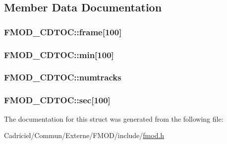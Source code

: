 \subsection{Member Data Documentation}
\hypertarget{struct_f_m_o_d___c_d_t_o_c_a40e8bdc25c765a02c4ca0af13c74dc5f}{
\subsubsection[{frame}]{ F\-M\-O\-D\-\_\-\-C\-D\-T\-O\-C\-::frame\mbox{[}100\mbox{]}}}\label{struct_f_m_o_d___c_d_t_o_c_a40e8bdc25c765a02c4ca0af13c74dc5f}
\hypertarget{struct_f_m_o_d___c_d_t_o_c_ac32672636e86e7d5da6cd02737123f0e}{
\subsubsection[{min}]{ F\-M\-O\-D\-\_\-\-C\-D\-T\-O\-C\-::min\mbox{[}100\mbox{]}}}\label{struct_f_m_o_d___c_d_t_o_c_ac32672636e86e7d5da6cd02737123f0e}
\hypertarget{struct_f_m_o_d___c_d_t_o_c_aad0a3526919d1d67958c47179a73cf7b}{
\subsubsection[{numtracks}]{ F\-M\-O\-D\-\_\-\-C\-D\-T\-O\-C\-::numtracks}}\label{struct_f_m_o_d___c_d_t_o_c_aad0a3526919d1d67958c47179a73cf7b}
\hypertarget{struct_f_m_o_d___c_d_t_o_c_a20dcf991841f7f4322904f9a1175e7c6}{
\subsubsection[{sec}]{ F\-M\-O\-D\-\_\-\-C\-D\-T\-O\-C\-::sec\mbox{[}100\mbox{]}}}\label{struct_f_m_o_d___c_d_t_o_c_a20dcf991841f7f4322904f9a1175e7c6}


The documentation for this struct was generated from the following file\-:\begin{DoxyCompactItemize}
\item 
Cadriciel/\-Commun/\-Externe/\-F\-M\-O\-D/include/\hyperlink{fmod_8h}{fmod.\-h}\end{DoxyCompactItemize}
